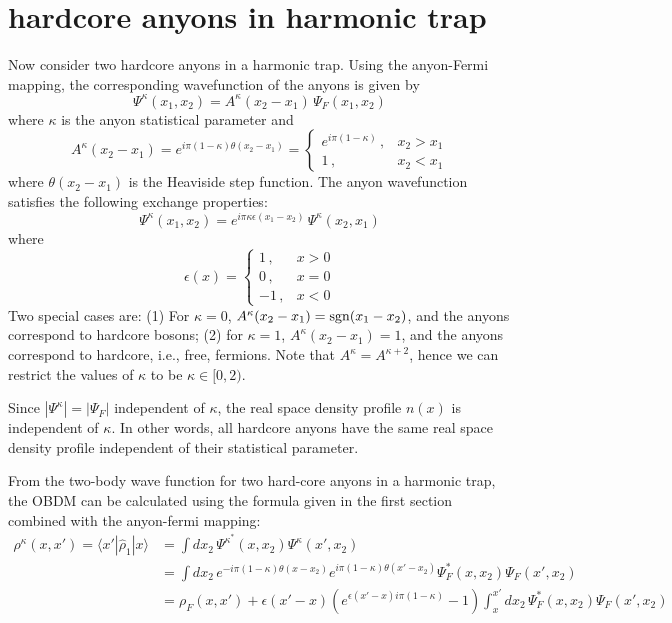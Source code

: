 \documentclass[onecolumn,english,aps,pra]{revtex4}
\begin{document}
\section{hardcore anyons in harmonic trap}
Now consider two hardcore anyons in a harmonic trap. Using the anyon-Fermi mapping, the corresponding wavefunction of the anyons is given by 
\[ \Psi^\kappa (x_1,x_2) = A^\kappa(x_2-x_1) \,\Psi_F(x_1,x_2) \]
where $\kappa$ is the anyon statistical parameter and 
\[ A^\kappa (x_2-x_1) = e^{i\pi (1-\kappa) \theta(x_2-x_1)}= \left\{ \begin{array}{ll} e^{i\pi(1-\kappa)}\,, & x_2>x_1 \\ 1 \,, & x_2 <x_1 \end{array}  \right.  \] where $\theta(x_2-x_1)$ is the Heaviside step function.
The anyon wavefunction satisfies the following exchange properties:
\[ \Psi^{\kappa}(x_1,x_2) = e^{i\pi \kappa \epsilon(x_1-x_2)} \,\Psi^\kappa(x_2,x_1) \]
where \[ \epsilon(x) =  \left\{  \begin{array}{cl} 1\,, & x>0 \\ 0 \,, & x=0 \\ -1\,, & x<0 \end{array} \right.\]
Two special cases are: (1) For $\kappa=0$, $ A^\kappa (x_2-x_1) = {\rm sgn}(x_1-x_2)$, and the anyons correspond to hardcore bosons; (2) for $\kappa=1$, $A^\kappa (x_2-x_1) = 1$, and the anyons correspond to hardcore, i.e., free, fermions. Note that $A^\kappa = A^{\kappa+2}$, hence we can restrict the values of $\kappa$ to be $\kappa \in [0, 2)$. 

Since $|\Psi^\kappa| = |\Psi_F|$ independent of $\kappa$, the real space density profile $n(x)$ is independent of $\kappa$. In other words, all hardcore anyons have the same real space density profile independent of their statistical parameter.

From the two-body wave function for two hard-core anyons in a harmonic trap, the OBDM can be calculated using the formula given in the first section combined with the anyon-fermi mapping:
\begin{align*}
\rho^\kappa(x,x')= \langle x'|\hat{\rho}_1| x \rangle &= \int dx_2 \, \Psi^{\kappa^*}(x,x_2) \Psi^\kappa(x',x_2)\\
& = \int dx_2 \,  e^{-i\pi (1-\kappa) \theta(x - x_2)} e^{i\pi (1-\kappa) \theta(x' - x_2)} \Psi_{F}^*(x,x_2) \Psi_{F}(x',x_2)\\
& = \rho_{F}(x,x') + \epsilon(x' - x)(e^{\epsilon(x' - x) i\pi (1-\kappa)} - 1)\int_{x}^{x'} dx_2 \, \Psi_{F}^*(x,x_2) \Psi_{F}(x',x_2)
\end{align*}
\end{document}

